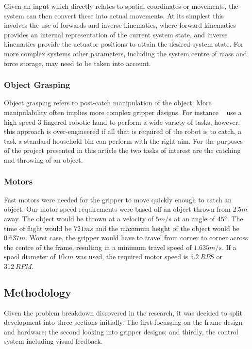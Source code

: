 \documentclass[conference]{IEEEtran}
\begin{document}
Given an input which directly relates to spatial coordinates or movements, the system can then convert these into actual movements. At its simplest this involves the use of forwards and inverse kinematics, where forward kinematics provides an internal representation of the current system state, and inverse kinematics provide the actuator positions to attain the desired system state. For more complex systems other parameters, including the system centre of mass and force storage, may need to be taken into account. 

\subsubsection{Object Grasping}
Object grasping refers to post-catch manipulation of the object. More manipulability often implies more complex gripper designs. For instance ~\cite{1249273} use a high speed 3-fingered robotic hand to perform a wide variety of tasks, however, this approach is over-engineered if all that is required of the robot is to catch, a task a standard household bin can perform with the right aim.
For the purposes of the project presented in this article the two tasks of interest are the catching and throwing of an object.

\subsubsection{Motors}\label{motorSpeedRequired}
Fast motors were needed for the gripper to move quickly enough to catch an object. Our motor speed requirements were based off an object thrown from $2.5m$ away. The object would be thrown at a velocity of $5m/s$ at an angle of $45\degree$. The time of flight would be $721ms$ and the maximum height of the object would be $0.637m$. Worst case, the gripper would have to travel from corner to corner across the centre of the frame, resulting in a minimum travel speed of $1.635m/s$. If a spool diameter of $10cm$ was used, the required motor speed is $5.2\ RPS$ or $312\ RPM$.

\subsection{Methodology}
Given the problem breakdown discovered in the research, it was decided to split development into three sections initially. The first focussing on the frame design and hardware; the second looking into gripper designs; and thirdly, the control system including visual feedback.
\end{document}
